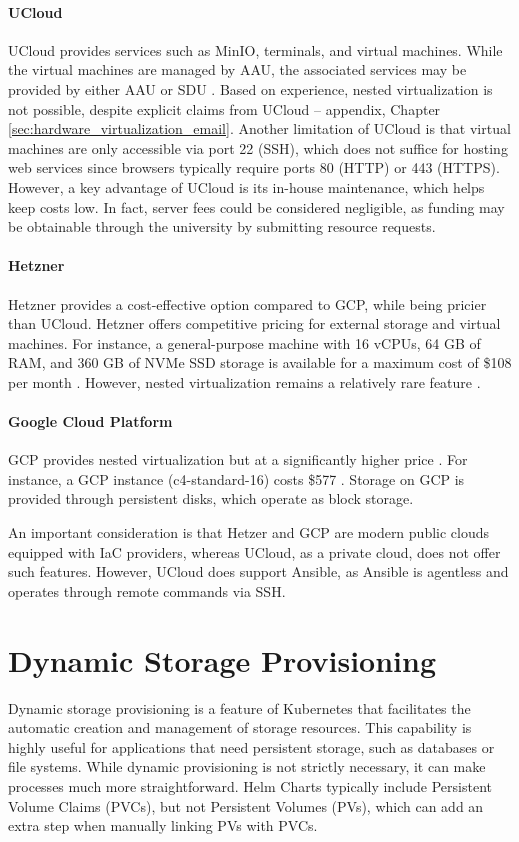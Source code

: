\paragraph{UCloud} UCloud provides services such as MinIO, terminals, and virtual machines. While the virtual machines are managed by AAU, the associated services may be provided by either AAU or SDU \cite{sdu_cloud_providers}. Based on experience, nested virtualization is not possible, despite explicit claims from UCloud -- appendix, Chapter \ref{sec:hardware_virtualization_email}. Another limitation of UCloud is that virtual machines are only accessible via port 22 (SSH), which does not suffice for hosting web services since browsers typically require ports 80 (HTTP) or 443 (HTTPS). However, a key advantage of UCloud is its in-house maintenance, which helps keep costs low. In fact, server fees could be considered negligible, as funding may be obtainable through the university by submitting resource requests. 

\paragraph{Hetzner} Hetzner provides a cost-effective option compared to GCP, while being pricier than UCloud. Hetzner offers competitive pricing for external storage and virtual machines. For instance, a general-purpose machine with 16 vCPUs, 64 GB of RAM, and 360 GB of NVMe SSD storage is available for a maximum cost of \$108 per month \cite{hetznercloud}. However, nested virtualization remains a relatively rare feature \cite{hetzner_nested_virtualization}.

\paragraph{Google Cloud Platform} GCP provides nested virtualization but at a significantly higher price \cite{gcp_nested_virtualization}. For instance, a GCP instance (c4-standard-16) costs \$577 \cite{google2025pricing}. Storage on GCP is provided through persistent disks, which operate as block storage.

An important consideration is that Hetzer and GCP are modern public clouds equipped with IaC providers, whereas UCloud, as a private cloud, does not offer such features. However, UCloud does support Ansible, as Ansible is agentless and operates through remote commands via SSH.

\section{Dynamic Storage Provisioning}
Dynamic storage provisioning is a feature of Kubernetes that facilitates the automatic creation and management of storage resources. This capability is highly useful for applications that need persistent storage, such as databases or file systems. While dynamic provisioning is not strictly necessary, it can make processes much more straightforward. Helm Charts typically include Persistent Volume Claims (PVCs), but not Persistent Volumes (PVs), which can add an extra step when manually linking PVs with PVCs.

